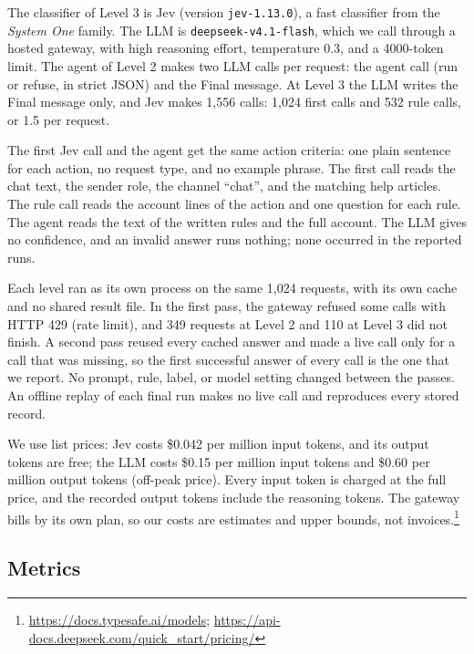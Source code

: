 \documentclass[sigconf,nonacm]{acmart}
\begin{document}
The classifier of Level 3 is Jev (version \nolinkurl{jev-1.13.0}), a fast classifier from the \emph{System One} family. The LLM is \nolinkurl{deepseek-v4.1-flash}, which we call through a hosted gateway, with high reasoning effort, temperature 0.3, and a 4000-token limit. The agent of Level 2 makes two LLM calls per request: the agent call (run or refuse, in strict JSON) and the Final message. At Level 3 the LLM writes the Final message only, and Jev makes 1,556 calls: 1,024 first calls and 532 rule calls, or 1.5 per request.

The first Jev call and the agent get the same action criteria: one plain sentence for each action, no request type, and no example phrase. The first call reads the chat text, the sender role, the channel ``chat'', and the matching help articles. The rule call reads the account lines of the action and one question for each rule. The agent reads the text of the written rules and the full account. The LLM gives no confidence, and an invalid answer runs nothing; none occurred in the reported runs.

Each level ran as its own process on the same 1,024 requests, with its own cache and no shared result file. In the first pass, the gateway refused some calls with HTTP 429 (rate limit), and 349 requests at Level 2 and 110 at Level 3 did not finish. A second pass reused every cached answer and made a live call only for a call that was missing, so the first successful answer of every call is the one that we report. No prompt, rule, label, or model setting changed between the passes. An offline replay of each final run makes no live call and reproduces every stored record.

We use list prices: Jev costs \$0.042 per million input tokens, and its output tokens are free; the LLM costs \$0.15 per million input tokens and \$0.60 per million output tokens (off-peak price). Every input token is charged at the full price, and the recorded output tokens include the reasoning tokens. The gateway bills by its own plan, so our costs are estimates and upper bounds, not invoices.\footnote{\url{https://docs.typesafe.ai/models}; \url{https://api-docs.deepseek.com/quick_start/pricing/}}

\subsection{Metrics}\label{sec:metrics}
\end{document}
